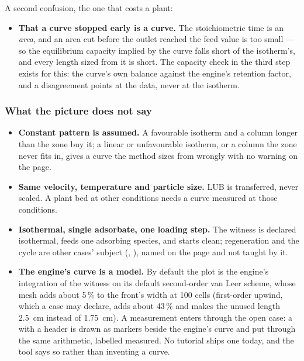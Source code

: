 \documentclass[11pt,a4paper]{article}
\begin{document}
A second confusion, the one that costs a plant:

\begin{itemize}[leftmargin=*,nosep,topsep=4pt]
  \item \textbf{That a curve stopped early is a curve.}  The stoichiometric
        time is an \emph{area}, and an area cut before the outlet reached
        the feed value is too small --- so the equilibrium capacity implied
        by the curve falls short of the isotherm's, and every length sized
        from it is short.  The capacity check in the third step exists for
        this: the curve's own balance against the engine's retention
        factor, and a disagreement points at the data, never at the
        isotherm.
\end{itemize}

\subsubsection*{What the picture does not say}

\begin{itemize}[leftmargin=*,nosep]
  \item \textbf{Constant pattern is assumed.}  A favourable isotherm and a
        column longer than the zone buy it; a linear or unfavourable
        isotherm, or a column the zone never fits in, gives a curve the
        method sizes from wrongly with no warning on the page.
  \item \textbf{Same velocity, temperature and particle size.}  LUB is
        transferred, never scaled.  A plant bed at other conditions needs a
        curve measured at those conditions.
  \item \textbf{Isothermal, single adsorbate, one loading step.}  The
        witness is declared isothermal, feeds one adsorbing species, and
        starts clean; regeneration and the cycle are other cases' subject
        (, ), named
        on the page and not taught by it.
  \item \textbf{The engine's curve is a model.}  By default the plot is the
        engine's integration of the witness on its default second-order
        van Leer scheme, whose mesh adds about 5\,\% to the front's width
        at 100 cells (first-order upwind, which a case may declare, adds
        about 43\,\% and makes the unused length 2.5~cm instead of
        1.75~cm).  A
        measurement enters through the open case: a
         with a
         header is drawn as markers beside the
        engine's curve and put through the same arithmetic, labelled
        measured.  No tutorial ships one today, and the tool says so rather
        than inventing a curve.
\end{itemize}
\end{document}
